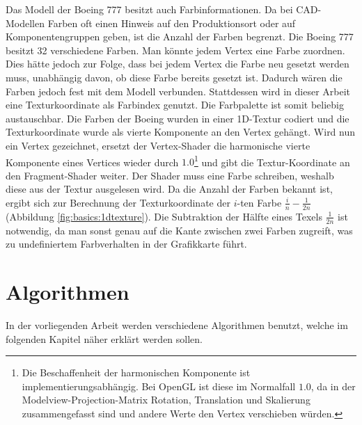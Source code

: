 Das Modell der Boeing 777 besitzt auch Farbinformationen. Da bei CAD-Modellen Farben oft einen Hinweis auf den Produktionsort oder auf Komponentengruppen geben, ist die Anzahl der Farben begrenzt. Die Boeing 777 besitzt 32 verschiedene Farben. Man könnte jedem Vertex eine Farbe zuordnen. Dies hätte jedoch zur Folge, dass bei jedem Vertex die Farbe neu gesetzt werden muss, unabhängig davon, ob diese Farbe bereits gesetzt ist. Dadurch wären die Farben jedoch fest mit dem Modell verbunden. Stattdessen wird in dieser Arbeit eine Texturkoordinate als Farbindex genutzt. Die Farbpalette ist somit beliebig austauschbar. Die Farben der Boeing wurden in einer 1D-Textur codiert und die Texturkoordinate wurde als vierte Komponente an den Vertex gehängt. Wird nun ein Vertex gezeichnet, ersetzt der Vertex-Shader die harmonische vierte Komponente eines Vertices wieder durch $1.0$\footnote{Die Beschaffenheit der harmonischen Komponente ist implementierungsabhängig. Bei OpenGL ist diese im Normalfall $1.0$, da in der Modelview-Projection-Matrix Rotation, Translation und Skalierung zusammengefasst sind und andere Werte den Vertex verschieben würden.} und gibt die Textur-Koordinate an den Fragment-Shader weiter. Der Shader muss eine Farbe schreiben, weshalb diese aus der Textur ausgelesen wird. Da die Anzahl der Farben bekannt ist, ergibt sich zur Berechnung der Texturkoordinate der $i$-ten Farbe $\frac{i}{n}-\frac{1}{2n}$ (Abbildung \ref{fig:basics:1dtexture}). Die Subtraktion der Hälfte eines Texels $\frac{1}{2n}$ ist notwendig, da man sonst genau auf die Kante zwischen zwei Farben zugreift, was zu undefiniertem Farbverhalten in der Grafikkarte führt.

\section{Algorithmen}
\label{sec:basics:algos}
In der vorliegenden Arbeit werden verschiedene Algorithmen benutzt, welche im folgenden Kapitel näher erklärt werden sollen.

